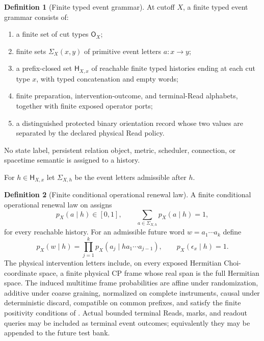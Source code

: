 \documentclass[11pt]{article}
\theoremstyle{definition}
\newtheorem{definition}[definition]{Definition}
\theoremstyle{remark}
\newcommand{\CP}{\mathrm{CP}}
\begin{document}
\begin{definition}[Finite typed event grammar]
\label{def:supp-event-grammar}
At cutoff $X$, a finite typed event grammar consists of:
\begin{enumerate}[label=\textup{(E\arabic*)},leftmargin=3em]
\item a finite set of cut types $\mathsf O_X$;
\item finite sets $\Sigma_X(x,y)$ of primitive event letters $a:x\to y$;
\item a prefix-closed set $\mathsf H_{X,x}$ of reachable finite typed histories
      ending at each cut type $x$, with typed concatenation and empty words;
\item finite preparation, intervention-outcome, and terminal-Read alphabets,
      together with finite exposed operator ports;
\item a distinguished protected binary orientation record whose two values are
      separated by the declared physical Read policy.
\end{enumerate}
No state label, persistent relation object, metric, scheduler, connection, or
spacetime semantic is assigned to a history.
\end{definition}

For $h\in\mathsf H_{X,x}$ let $\Sigma_{X,h}$ be the event letters admissible
after $h$.

\begin{definition}[Finite conditional operational renewal law]
\label{def:supp-operational-datum}
A finite conditional operational renewal law on
 assigns
\begin{equation}
 p_X(a\mid h)\in[0,1],
 \qquad
 \sum_{a\in\Sigma_{X,h}}p_X(a\mid h)=1,
 \label{eq:supp-one-step-law}
\end{equation}
for every reachable history.  For an admissible future word
$w=a_1\cdots a_k$ define
\begin{equation}
 p_X(w\mid h)
 =\prod_{j=1}^{k}
 p_X(a_j\mid ha_1\cdots a_{j-1}),
 \qquad p_X(\epsilon_x\mid h)=1.
 \label{eq:supp-chain-law}
\end{equation}
The physical intervention letters include, on every exposed Hermitian
Choi-coordinate space, a finite physical $\CP$ frame whose real span is the
full Hermitian space.  The induced multitime frame probabilities are affine
under randomization, additive under coarse graining, normalized on complete
instruments, causal under deterministic discard, compatible on common
prefixes, and satisfy the finite positivity conditions of
.  Actual bounded terminal Reads, marks, and
readout queries may be included as terminal event outcomes; equivalently they
may be appended to the future test bank.
\end{definition}
\end{document}
